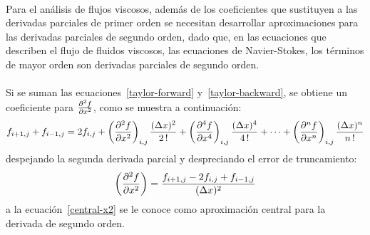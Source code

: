 \documentclass[letterpaper, openright, 12pt]{book}
\begin{document}
    \paragraph*{}
    Para el análisis de flujos viscosos, además de los coeficientes que sustituyen
    a las derivadas parciales de primer orden se necesitan desarrollar
    aproximaciones para las derivadas parciales de segundo orden, dado que, en
    las ecuaciones que describen el flujo de fluidos viscosos, las ecuaciones de
    Navier-Stokes, los términos de mayor orden son derivadas parciales de
    segundo orden.

    \paragraph*{}
    Si se suman las ecuaciones~\ref{taylor-forward} y~\ref{taylor-backward}, se
    obtiene un coeficiente para $\pdv[2]{f}{x}$, como se muestra a continuación:
    \begin{equation*}
    f_{i+1,j} + f_{i-1, j} = 2 f_{i,j} + \left( \pdv[2]{f}{x} \right)_{i,j} \frac{(\Delta x) ^2}{2\,!} + \left( \pdv[4]{f}{x} \right)_{i,j} \frac{(\Delta x)^4}{4\,!} + \dotsb + \left( \pdv[n]{f}{x} \right)_{i,j} \frac{(\Delta x)^n}{n\,!}
    \end{equation*}
    despejando la segunda derivada parcial y despreciando el error de truncamiento:
    \begin{equation}
    \left( \pdv[2]{f}{x} \right) = \frac{f_{i+1,j} - 2f_{i,j} + f_{i-1,j}}{(\Delta x)^2}
    \label{central-x2}
    \end{equation}
    a la ecuación~\ref{central-x2} se le conoce como aproximación central para
    la derivada de segundo orden.
\end{document}
